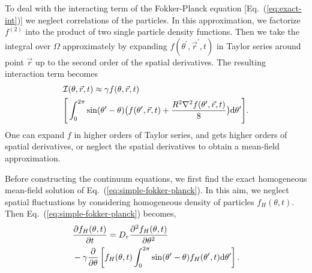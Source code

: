 \documentclass[reprint,floatfix,amsmath,amssymb,aps,pre,showkeys,showpacs,superscriptaddress]{revtex4-1}
\newcommand{\Dif}[2]{\frac{\partial #1}{\partial #2}}
\newcommand{\intr}{\mathcal{I}}
\newcommand{\dd}{{\rm d}}
\newcommand{\hl}[1]{\textcolor{hlcolor}{#1}}
\newcommand{\req}[1]{Eq.~(\ref{#1})}
\begin{document}
To deal with the interacting term of the Fokker-Planck equation [\req{eq:exact-int}] we  neglect correlations \hl{of the particles}. In this approximation, we factorize $f^{(2)}$ \hl{into the} product of two single particle density functions. Then we \hl{take} the integral over $\Omega$ approximately by expanding $f(\theta^\prime,\vec{r}^\prime, t)$ in Taylor series around point $\vec{r}$ up to \hl{the} second order of \hl{the} spatial derivatives. The resulting interaction term becomes
\begin{equation}
\begin{aligned}
&\intr(\theta,\vec{r},t) \approx \gamma f(\theta,\vec{r},t) \\
&\Bigg[ \int_0^{2 \pi} \sin(\theta^{\prime} - \theta) \big( f(\theta^{\prime},\vec{r},t) + \frac{R^2 \nabla^2 f(\theta^{\prime}, \vec{r}, t)}{8} \big) \dd \theta^{\prime} \Bigg].
\end{aligned}
\label{eq:fokker-planck-int}
\end{equation}
One can expand $f$ in higher orders of Taylor series, and gets higher orders of spatial derivatives, or neglect the spatial derivatives to obtain a mean-field approximation.

Before constructing the continuum equations, we first find the \hl{exact homogeneous mean-field  solution} of \req{eq:simple-fokker-planck}. \hl{In this aim}, we neglect spatial fluctuations by considering homogeneous density of particles $f_H(\theta,t)$. Then \req{eq:simple-fokker-planck} becomes,
\begin{equation}
\begin{aligned}
&\Dif{{f}_H (\theta,t)}{t} = D_r \frac{\partial^2 f_H(\theta,t)}{\partial \theta^2} \\
&-\gamma \frac{\partial}{\partial \theta} \left[f_H(\theta,t) \int_0^{2\pi} \sin(\theta^\prime - \theta) f_H(\theta^\prime,t) \dd \theta^\prime \right].
\end{aligned}
\label{eq:mean-field-fokker-plank}
\end{equation}
\end{document}
